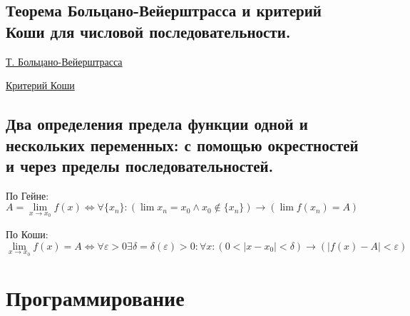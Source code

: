 \documentclass{article}
\begin{document}
\subsection{Теорема Больцано-Вейерштрасса и критерий Коши для числовой
последовательности.}


\href{https://ru.wikipedia.org/wiki/%D0%A2%D0%B5%D0%BE%D1%80%D0%B5%D0%BC%D0%B0_%D0%91%D0%BE%D0%BB%D1%8C%D1%86%D0%B0%D0%BD%D0%BE_%E2%80%94_%D0%92%D0%B5%D0%B9%D0%B5%D1%80%D1%88%D1%82%D1%80%D0%B0%D1%81%D1%81%D0%B0}{Т. Больцано-Вейерштрасса}


\href{https://ru.wikipedia.org/wiki/%D0%9A%D1%80%D0%B8%D1%82%D0%B5%D1%80%D0%B8%D0%B9_%D0%9A%D0%BE%D1%88%D0%B8}{Критерий Коши}


\subsection{Два определения предела функции одной и нескольких переменных:
с помощью окрестностей и через пределы последовательностей.}

По Гейне:
$A = \lim\limits_{x \to x_0} f(x) \iff
\forall \{x_n\}: (\lim x_n = x_0 \wedge x_0 \notin \{x_n\})
\rightarrow (\lim f(x_n) = A)$

По Коши:
$\lim\limits_{x \to x_0} f(x) = A \iff
\forall \varepsilon > 0 \exists \delta = \delta(\varepsilon) > 0:
\forall x : (0 < |x - x_0| < \delta) \rightarrow (|f(x) - A| < \varepsilon)$



\section{Программирование}
\end{document}

